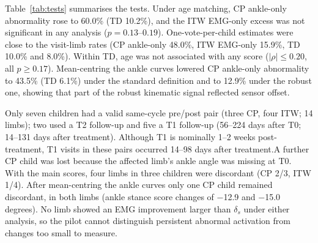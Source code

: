 \documentclass[conference]{IEEEtran}
\begin{document}
Table~\ref{tab:tests} summarises the tests. Under age matching, CP ankle-only abnormality rose to 60.0\% (TD 10.2\%), and the ITW EMG-only excess was not significant in any analysis ($p=0.13$--$0.19$). One-vote-per-child estimates were close to the visit-limb rates (CP ankle-only 48.0\%, ITW EMG-only 15.9\%, TD 10.0\% and 8.0\%). Within TD, age was not associated with any score ($|\rho|\le0.20$, all $p\ge0.17$). Mean-centring the ankle curves lowered CP ankle-only abnormality to 43.5\% (TD 6.1\%) under the standard definition and to 12.9\% under the robust one, showing that part of the robust kinematic signal reflected sensor offset.
\begin{table}[t]
\centering
\caption{Difference from TD in percentage points [95\% CI] and permutation $p$. Age-matched: patient visits aged 5.0--12.2 y (CP 14/19, ITW 9/11 children)}
\label{tab:tests}
\footnotesize
\setlength{\tabcolsep}{2.5pt}
\end{table}


Only seven children had a valid same-cycle pre/post pair (three CP, four ITW; 14 limbs); two used a T2 follow-up and five a T1 follow-up (56--224 days after T0; 14--131 days after treatment). Although T1 is nominally 1--2 weeks post-treatment, T1 visits in these pairs occurred 14--98 days after treatment.A further CP child was lost because the affected limb's ankle angle was missing at T0. With the main scores, four limbs in three children were discordant (CP 2/3, ITW 1/4). After mean-centring the ankle curves only one CP child remained discordant, in both limbs (ankle stance score changes of $-$12.9 and $-$15.0 degrees). No limb showed an EMG improvement larger than $\delta_s$ under either analysis, so the pilot cannot distinguish persistent abnormal activation from changes too small to measure.
\end{document}
